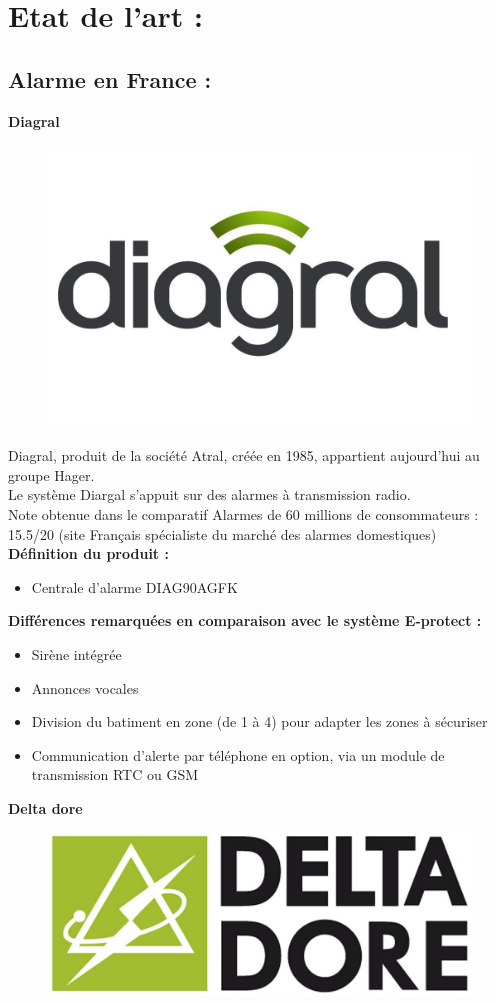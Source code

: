 \chapter{Etat de l'art :}

\section{Alarme en France :}

\textbf{Diagral}\\
\begin{figure}[h!]
	\begin{center}
		\includegraphics[width=0.4\linewidth]{../images/diagral}
	\end{center}
	\caption{\cite{www:diagral}}
\end{figure}
Diagral, produit de la société Atral, créée en 1985, appartient aujourd'hui au groupe Hager.\\
Le système Diargal s'appuit sur des alarmes à transmission radio.\\
Note obtenue dans le comparatif Alarmes de 60 millions de consommateurs : 15.5/20 (site Français spécialiste du marché des alarmes domestiques)\\
\textbf{Définition du produit :}
\begin{itemize}
\item Centrale d'alarme DIAG90AGFK
\end{itemize}

\textbf{Différences remarquées en comparaison avec le système E-protect :}
\begin{itemize}
\item Sirène intégrée
\item Annonces vocales
\item Division du batiment en zone (de 1 à 4) pour adapter les zones à sécuriser
\item Communication d'alerte par téléphone en option, via un module de transmission RTC ou GSM\\
\end{itemize}


\textbf{Delta dore}\\
\begin{figure}[h!]
	\begin{center}
		\includegraphics[width=0.4\linewidth]{../images/Deltadore}
	\end{center}
	\caption{\cite{www:deltadore}}
\end{figure}

